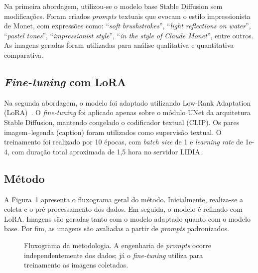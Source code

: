 Na primeira abordagem, utilizou-se o modelo base Stable Diffusion sem modificações. Foram criados \textit{prompts} textuais que evocam o estilo impressionista de Monet, com expressões como: ``\textit{soft brushstrokes}'', ``\textit{light reflections on water}'', ``\textit{pastel tones}'', ``\textit{impressionist style}'', ``\textit{in the style of Claude Monet}'', entre outros. As imagens geradas foram utilizadas para análise qualitativa e quantitativa comparativa.

\subsection{\textit{Fine-tuning} com LoRA}

Na segunda abordagem, o modelo foi adaptado utilizando Low-Rank Adaptation (LoRA)~\cite{lora}. O \textit{fine-tuning} foi aplicado apenas sobre o módulo UNet da arquitetura Stable Diffusion, mantendo congelado o codificador textual (CLIP). Os pares imagem–legenda (caption) foram utilizados como supervisão textual. O treinamento foi realizado por 10 épocas, com \textit{batch size} de 1 e \textit{learning rate} de 1e-4, com duração total aproximada de 1,5 hora no servidor LIDIA.

\subsection{Método}

A Figura~\ref{fig:fluxograma} apresenta o fluxograma geral do método. Inicialmente, realiza-se a coleta e o pré-processamento dos dados. Em seguida, o modelo é refinado com LoRA. Imagens são geradas tanto com o modelo adaptado quanto com o modelo base. Por fim, as imagens são avaliadas a partir de \textit{prompts} padronizados.

\begin{figure}[htb]
\centering
{}
\caption{Fluxograma da metodologia. A engenharia de \textit{prompts} ocorre independentemente dos dados; já o \textit{fine-tuning} utiliza para treinamento as imagens coletadas.}
\label{fig:fluxograma}
\end{figure}